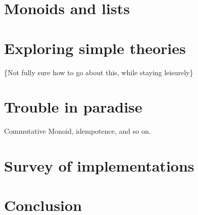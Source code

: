 \documentclass[acmsmall,review,anonymous,prologue,dvipsnames]{acmart}
\begin{document}
\section{ Monoids and lists}
\label{sec:monoid}


\section{Exploring simple theories}
\label{sec:exploring}
\{Not fully sure how to go about this, while staying
leisurely\}

\section{Trouble in paradise}
\label{sec:trouble}
Commutative Monoid, idempotence, and so on.

\section{Survey of implementations}

\section{Conclusion}

\label{sec:survey}
\end{document}
